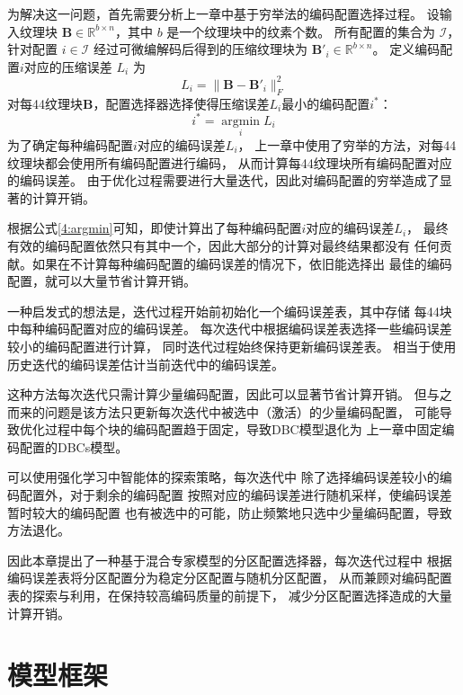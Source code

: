 为解决这一问题，首先需要分析上一章中基于穷举法的编码配置选择过程。
设输入纹理块 $\mathbf{B}\in\mathbb{R}^{b\times n}$，其中 $b$ 是一个纹理块中的纹素个数。
所有配置的集合为 $\mathcal{I}$，针对配置 $i\in\mathcal{I}$ 经过可微编解码后得到的压缩纹理块为 $\mathbf{B}'_i\in\mathbb{R}^{b\times n}$。
定义编码配置$i$对应的压缩误差 $L_i$ 为
\begin{equation}
L_i=\|\mathbf{B}-\mathbf{B}'_i\|_F^2
\end{equation}
对每4\times4纹理块$\mathbf{B}$，配置选择器选择使得压缩误差$L_i$最小的编码配置$i^*$：
\begin{equation}
    \label{4:argmin}
    i^*=\mathop{\arg\min}\limits_{i} L_i
\end{equation}
为了确定每种编码配置$i$对应的编码误差$L_i$，
上一章中使用了穷举的方法，对每4\times4纹理块都会使用所有编码配置进行编码，
从而计算每4\times4纹理块所有编码配置对应的编码误差。
由于优化过程需要进行大量迭代，因此对编码配置的穷举造成了显著的计算开销。

根据公式\ref{4:argmin}可知，即使计算出了每种编码配置$i$对应的编码误差$L_i$，
最终有效的编码配置依然只有其中一个，因此大部分的计算对最终结果都没有
任何贡献。如果在不计算每种编码配置的编码误差的情况下，依旧能选择出
最佳的编码配置，就可以大量节省计算开销。

一种启发式的想法是，迭代过程开始前初始化一个编码误差表，其中存储
每4\times4块中每种编码配置对应的编码误差。
每次迭代中根据编码误差表选择一些编码误差较小的编码配置进行计算，
同时迭代过程始终保持更新编码误差表。
相当于使用历史迭代的编码误差估计当前迭代中的编码误差。

这种方法每次迭代只需计算少量编码配置，因此可以显著节省计算开销。
但与之而来的问题是该方法只更新每次迭代中被选中（激活）的少量编码配置，
可能导致优化过程中每个块的编码配置趋于固定，导致DBC模型退化为
上一章中固定编码配置的DBCs模型。

可以使用强化学习中智能体的探索策略，每次迭代中
除了选择编码误差较小的编码配置外，对于剩余的编码配置
按照对应的编码误差进行随机采样，使编码误差暂时较大的编码配置
也有被选中的可能，防止频繁地只选中少量编码配置，导致方法退化。

因此本章提出了一种基于混合专家模型的分区配置选择器，每次迭代过程中
根据编码误差表将分区配置分为稳定分区配置与随机分区配置，
从而兼顾对编码配置表的探索与利用，在保持较高编码质量的前提下，
减少分区配置选择造成的大量计算开销。

\section{模型框架}

